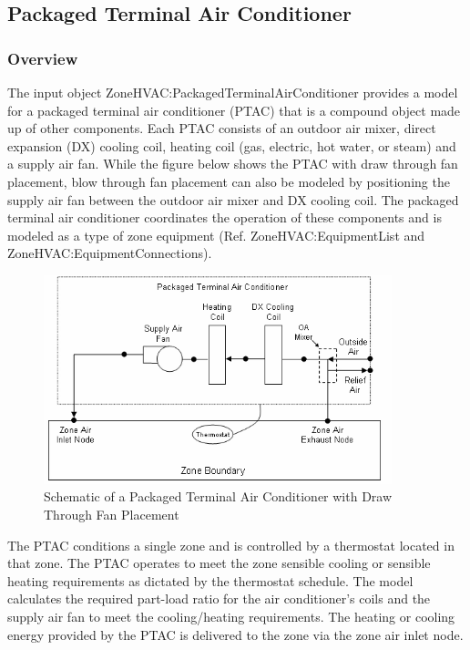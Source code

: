 \subsection{Packaged Terminal Air Conditioner}\label{packaged-terminal-air-conditioner}

\subsubsection{Overview}\label{overview-6-001}

The input object ZoneHVAC:PackagedTerminalAirConditioner provides a model for a packaged terminal air conditioner (PTAC) that is a compound object made up of other components. Each PTAC consists of an outdoor air mixer, direct expansion (DX) cooling coil, heating coil (gas, electric, hot water, or steam) and a supply air fan. While the figure below shows the PTAC with draw through fan placement, blow through fan placement can also be modeled by positioning the supply air fan between the outdoor air mixer and DX cooling coil. The packaged terminal air conditioner coordinates the operation of these components and is modeled as a type of zone equipment (Ref. ZoneHVAC:EquipmentList and ZoneHVAC:EquipmentConnections).

\begin{figure}[hbtp] %
\centering
\includegraphics[width=0.9\textwidth, height=0.9\textheight, keepaspectratio=true]{media/image7172.png}
\caption{Schematic of a Packaged Terminal Air Conditioner with Draw Through Fan Placement \protect \label{fig:schematic-of-a-packaged-terminal-air}}
\end{figure}

The PTAC conditions a single zone and is controlled by a thermostat located in that zone. The PTAC operates to meet the zone sensible cooling or sensible heating requirements as dictated by the thermostat schedule. The model calculates the required part-load ratio for the air conditioner's coils and the supply air fan to meet the cooling/heating requirements. The heating or cooling energy provided by the PTAC is delivered to the zone via the zone air inlet node.

